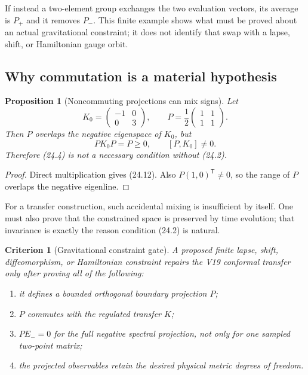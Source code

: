 \documentclass[11pt]{article}
\newtheorem{proposition}[theorem]{Proposition}
\newtheorem{criterion}[theorem]{Criterion}
\theoremstyle{remark}
\begin{document}
If instead a two-element group exchanges the two evaluation vectors, its
average is \(P_+\) and it removes \(P_-\).  This finite example shows what
must be proved about an actual gravitational constraint; it does not
identify that swap with a lapse, shift, or Hamiltonian gauge orbit.

\subsection{Why commutation is a material hypothesis}

\begin{proposition}[Noncommuting projections can mix signs]
\label{prop:v19v21-noncommuting}
Let
\[
 K_0=\begin{pmatrix}-1&0\\0&3\end{pmatrix},
 \qquad
 P=\frac12\begin{pmatrix}1&1\\1&1\end{pmatrix}.
\]
Then \(P\) overlaps the negative eigenspace of \(K_0\), but
\[
 PK_0P=P\geq0,\qquad [P,K_0]\neq0.                             \tag{24.12}
\]
Therefore (24.4) is not a necessary condition without (24.2).
\end{proposition}

\begin{proof}
Direct multiplication gives (24.12).  Also
\(P(1,0)^{\mathsf T}\neq0\), so the range of \(P\) overlaps the negative
eigenline.
\end{proof}

For a transfer construction, such accidental mixing is insufficient by
itself.  One must also prove that the constrained space is preserved by
time evolution; that invariance is exactly the reason condition (24.2)
is natural.

\begin{criterion}[Gravitational constraint gate]
\label{crit:v19v21-gravity}
A proposed finite lapse, shift, diffeomorphism, or Hamiltonian constraint
repairs the V19 conformal transfer only after proving all of the following:
\begin{enumerate}
 \item it defines a bounded orthogonal boundary projection \(P\);
 \item \(P\) commutes with the regulated transfer \(K\);
 \item \(PE_-=0\) for the full negative spectral projection, not only for
       one sampled two-point matrix;
 \item the projected observables retain the desired physical metric
       degrees of freedom.
\end{enumerate}
\end{criterion}
\end{document}
